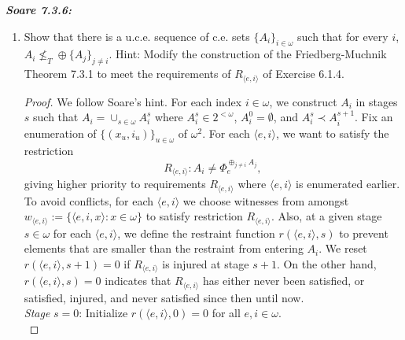 \documentclass{article}
\begin{document}
\it \textbf{Soare 7.3.6:}
  \begin{enumerate}[label={(\roman*)}]
    \item Show that there is a u.c.e. sequence of c.e. sets
      $\{A_i\}_{i\in\omega}$ such that for every $i$, $A_i\not\leq_T \oplus
      \{A_j\}_{j\neq i}$. Hint: Modify the construction of the
      Friedberg-Muchnik Theorem 7.3.1 to meet the requirements of
      $R_{\langle e,i\rangle}$ of Exercise 6.1.4.

      \begin{proof}
        We follow Soare's hint. For each index $i\in\omega$, we construct
        $A_i$ in stages $s$ such that $A_i=\cup_{s\in\omega}A_i^s$ where
        $A_i^s\in2^{<\omega}$, $A_i^0=\emptyset$, and $A_i^s\prec
        A_i^{s+1}$. Fix an enumeration of $\{(x_u,i_u)\}_{u\in\omega}$ of
        $\omega^2$. For each $\langle e,i\rangle$, we want to satisfy the
        restriction \[R_{\langle e,i\rangle}: A_i\neq\Phi_e^{\oplus_{j\neq
        i}A_j},\] giving higher priority to requirements $R_{\langle
        e,i\rangle}$ where $\langle e,i\rangle$ is enumerated earlier. \\

        To avoid conflicts, for each $\langle e,i\rangle$ we choose
        witnesses from amongst $w_{\langle e,i\rangle}:=\{\langle
        e,i,x\rangle: x\in\omega\}$ to satisfy restriction $R_{\langle
        e,i\rangle}$. Also, at a given stage $s\in\omega$ for each
        $\langle e,i\rangle$, we define the restraint function $r(\langle
        e,i\rangle,s)$ to prevent elements that are smaller than the
        restraint from entering $A_i$. We reset $r(\langle
        e,i\rangle,s+1)=0$ if $R_{\langle e,i\rangle}$ is injured at stage
        $s+1$. On the other hand, $r(\langle e,i\rangle,s)=0$ indicates
        that $R_{\langle e,i\rangle}$ has either never been satisfied, or
        satisfied, injured, and never satisfied since then until now. \\

        \textit{Stage} $s=0$: Initialize $r(\langle e,i\rangle,0)=0$ for all
        $e,i\in\omega$. \\


\end{proof}
\end{enumerate}
\end{document}
